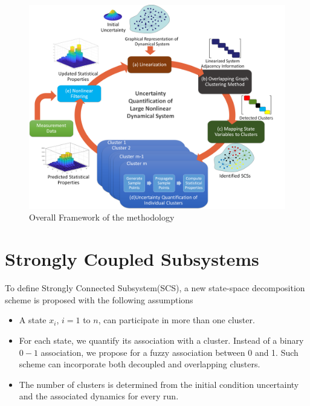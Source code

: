 \begin{figure}[H]
\centering
\includegraphics[scale=0.2]{figures_2/framework}
\caption{Overall Framework of the methodology}
\label{framework_fig}
\end{figure}

\section{Strongly Coupled Subsystems}

\newcommand{\bigCI}{\mathrel{\text{\scalebox{1.07}{$\perp\mkern-10mu\perp$}}}}
\newcommand{\nbigCI}{\centernot{\bigCI}}

\newcommand{\CI}{\mathrel{\perp\mspace{-10mu}\perp}}
\newcommand{\nCI}{\centernot{\CI}}

To define Strongly Connected Subsystem(SCS), a new state-space decomposition scheme is proposed with the following assumptions
\begin{itemize}
\item A state $x_i$, $i = 1$ to $n$, can participate in more than one cluster.
\item For each state, we quantify its association with a cluster. Instead of a binary $0-1$ association, we propose for a fuzzy association between 0 and 1. Such scheme can incorporate both decoupled and overlapping clusters.
\item The number of clusters is determined from the initial condition uncertainty and the associated dynamics for every run.
\end{itemize}

